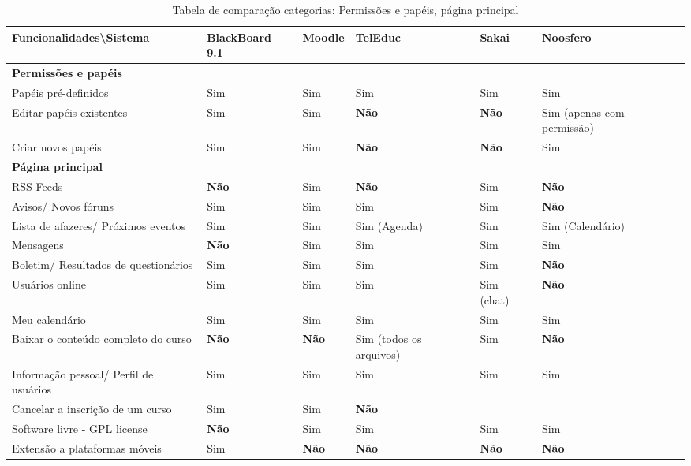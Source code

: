 \begin{landscape}
\begin{table}[H]
\begin{tabular}{|@{}p{5.5cm}|p{3.5cm}|p{3.5cm}|p{3.5cm}|p{3.5cm}|p{3.5cm}@{}|}
\hline
\textbf{Funcionalidades\textbackslash Sistema} & \textbf{BlackBoard 9.1} & \textbf{Moodle} & \textbf{TelEduc} & \textbf{Sakai} & \textbf{Noosfero}\\ \hline
\textbf{Permissões e papéis} &  &  &  &  &  \\
Papéis pré-definidos & Sim & Sim & Sim & Sim & Sim \\
Editar papéis existentes & Sim & Sim & \textbf{Não}  & \textbf{Não}  & Sim {\tiny(apenas com permissão)} \\
Criar novos papéis & Sim & Sim & \textbf{Não}  & \textbf{Não}  & Sim \\ \hline
\textbf{Página principal} &  &  &  &  &  \\
RSS Feeds & \textbf{Não}  & Sim & \textbf{Não}  & Sim & \textbf{Não}  \\
Avisos/ Novos fóruns & Sim & Sim & Sim & Sim & \textbf{Não}  \\
Lista de afazeres/ Próximos eventos & Sim & Sim & Sim {\tiny(Agenda)} & Sim & Sim {\tiny(Calendário)} \\
Mensagens & \textbf{Não}  & Sim & Sim & Sim & Sim \\
Boletim/ Resultados de questionários & Sim & Sim & Sim & Sim & \textbf{Não}  \\
Usuários online & Sim & Sim & Sim & Sim {\tiny(chat)} & \textbf{Não}  \\
Meu calendário & Sim & Sim & Sim & Sim & Sim \\
Baixar o conteúdo completo do curso & \textbf{Não}  & \textbf{Não}  & Sim {\tiny(todos os arquivos)} & Sim & \textbf{Não}  \\
Informação pessoal/ Perfil de usuários & Sim & Sim & Sim & Sim & Sim \\
Cancelar a inscrição de um curso & Sim & Sim & \textbf{Não}  &  &  \\
Software livre - GPL license & \textbf{Não}  & Sim & Sim & Sim & Sim \\
Extensão a plataformas móveis & Sim & \textbf{Não}  & \textbf{Não}  & \textbf{Não}  & \textbf{Não}  \\ \hline
\end{tabular}
\caption{Tabela de comparação categorias: Permissões e papéis, página principal}
\label{tab:permissoes-principal}
\end{table}

\end{landscape}

